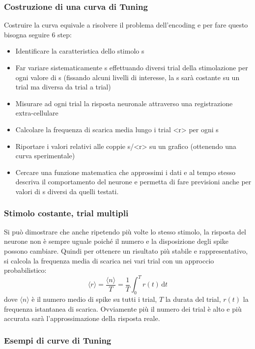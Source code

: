 \documentclass[12pt,a4paper,openany]{book}
\begin{document}
\subsubsection{Costruzione di una curva di Tuning}

Costruire la curva equivale a risolvere il problema dell'encoding e per fare questo bisogna seguire 6 step:

\begin{itemize}
  \item Identificare la caratteristica dello stimolo s
  \item Far variare sistematicamente s effettuando diversi trial della stimolazione per ogni valore di s (fissando alcuni livelli di interesse, la s sarà costante su un trial ma diversa da trial a trial)
  \item Misurare ad ogni trial la risposta neuronale attraverso una registrazione extra-cellulare
  \item Calcolare la frequenza di scarica media lungo i trial <r> per ogni s
  \item Riportare i valori relativi alle coppie s/<r> su un grafico (ottenendo una curva sperimentale)
  \item Cercare una funzione matematica che approssimi i dati e al tempo stesso descriva il comportamento del neurone e permetta di fare previsioni anche per valori di s diversi da quelli testati.
\end{itemize}
\subsubsection{Stimolo costante, trial multipli}

Si può dimostrare che anche ripetendo più volte lo stesso stimolo, la risposta del neurone non è sempre uguale poiché il numero e la disposizione degli spike possono cambiare. Quindi per ottenere un risultato più stabile e rappresentativo, si calcola la frequenza media di scarica nei vari trial con un approccio probabilistico:
\[
\langle r \rangle = \frac{\langle n \rangle}{T} = \frac{1}{T}\int_0^T r(t)\,\mathrm{d}t
\]
dove $\langle n \rangle$ è il numero medio di spike su tutti i trial, $T$ la durata del trial, $r(t)$ la frequenza istantanea di scarica. Ovviamente più il numero dei trial è alto e più accurata sarà l'approssimazione della risposta reale.

\subsubsection{Esempi di curve di Tuning}
\end{document}
